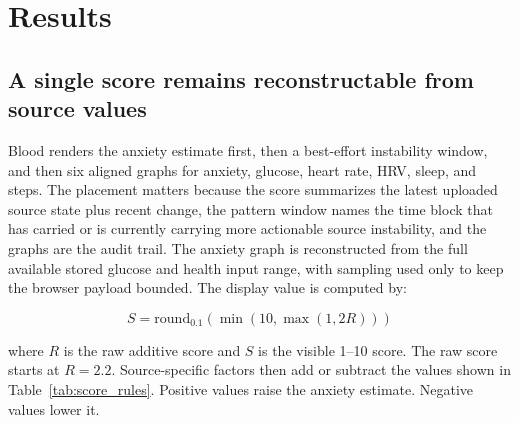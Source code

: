 \documentclass[12pt,letterpaper]{article}
\begin{document}
\section{Results}

\subsection{A single score remains reconstructable from source values}

Blood renders the anxiety estimate first, then a best-effort instability window, and then six aligned graphs for anxiety, glucose, heart rate, HRV, sleep, and steps. The placement matters because the score summarizes the latest uploaded source state plus recent change, the pattern window names the time block that has carried or is currently carrying more actionable source instability, and the graphs are the audit trail. The anxiety graph is reconstructed from the full available stored glucose and health input range, with sampling used only to keep the browser payload bounded. The display value is computed by:

\[
S = \mathrm{round}_{0.1}\left(\min\left(10,\max\left(1,2R\right)\right)\right)
\]

where $R$ is the raw additive score and $S$ is the visible 1--10 score. The raw score starts at $R=2.2$. Source-specific factors then add or subtract the values shown in Table~\ref{tab:score_rules}. Positive values raise the anxiety estimate. Negative values lower it.
\end{document}
